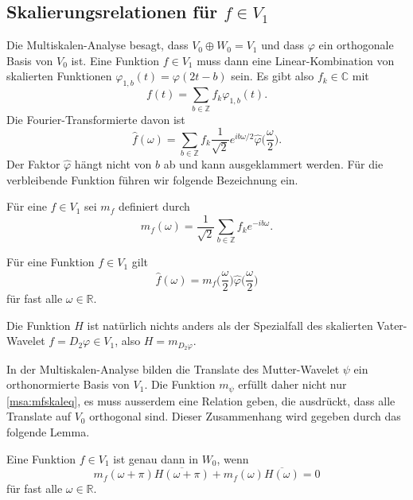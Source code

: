 \subsection{Skalierungsrelationen für $f\in V_1$}
Die Multiskalen-Analyse besagt, dass $V_0 \oplus W_0 = V_1$ und dass
$\varphi$ ein orthogonale Basis von $V_0$ ist.
Eine Funktion $f\in V_1$ muss dann eine Linear-Kombination von
skalierten Funktionen $\varphi_{1,b}(t)=\varphi(2t-b)$ sein.
Es gibt also $f_k\in\mathbb C$ mit
\[
f(t) = \sum_{b\in\mathbb Z} f_k \varphi_{1,b}(t).
\]
Die Fourier-Transformierte davon ist
\[
\hat{f}(\omega)
=
\sum_{b\in\mathbb Z}
f_k
\frac{1}{\sqrt{2}}
e^{ib\omega/2}
\hat{\varphi}
\biggl(\frac{\omega}2\biggr).
\]
Der Faktor $\hat{\varphi}$ hängt nicht von $b$ ab und kann ausgeklammert
werden.
Für die verbleibende Funktion führen wir folgende Bezeichnung ein.

\begin{definition}
Für eine $f\in V_1$ sei $m_f$ definiert durch
\[
m_f(\omega)
=
\frac{1}{\sqrt{2}} \sum_{b\in\mathbb Z} f_k e^{-ib\omega}.
\]
\end{definition}

\begin{lemma}
\label{msa:mfskal}
Für eine Funktion $f\in V_1$ gilt
\begin{equation}
\hat{f}(\omega)
=
m_f\biggl(\frac{\omega}2\biggr)
\hat{\varphi}\biggl(\frac{\omega}2\biggr)
\label{msa:mfskaleq}
\end{equation}
für fast alle $\omega\in\mathbb R$.
\end{lemma}

Die Funktion $H$ ist natürlich nichts anders als der Spezialfall
des skalierten Vater-Wavelet $f=D_2\varphi\in V_1$, also $H=m_{D_2\varphi}$.

In der Multiskalen-Analyse bilden die Translate des Mutter-Wavelet $\psi$
ein orthonormierte Basis von $V_1$.
Die Funktion $m_{\psi}$ erfüllt daher nicht nur \eqref{msa:mfskaleq},
es muss ausserdem eine Relation geben, die ausdrückt, dass alle Translate auf
$V_0$ orthogonal sind.
Dieser Zusammenhang wird gegeben durch das folgende Lemma.

\begin{lemma}
Eine Funktion $f\in V_1$ ist genau dann in $W_0$, wenn 
\[
m_f(\omega + \pi)\overline{H(\omega + \pi)}
+
m_f(\omega)\overline{H(\omega)}
=
0
\]
für fast alle $\omega\in\mathbb R$.
\end{lemma}

